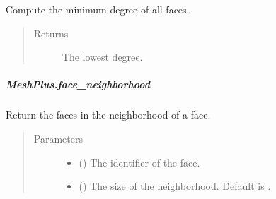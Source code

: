 \documentclass[letterpaper,10pt,english]{sphinxmanual}
\begin{document}
\begin{fulllineitems}
\begin{fulllineitems}
\label{\detokenize{api/generated/directional_clustering.mesh.MeshPlus.face_min_degree:directional_clustering.mesh.MeshPlus.face_min_degree}}
Compute the minimum degree of all faces.
\begin{quote}\begin{description}
\item[{Returns}] \leavevmode
{} \textendash{} The lowest degree.

\end{description}\end{quote}

\end{fulllineitems}



\subparagraph{MeshPlus.face\_neighborhood}
\label{\detokenize{api/generated/directional_clustering.mesh.MeshPlus.face_neighborhood:meshplus-face-neighborhood}}\label{\detokenize{api/generated/directional_clustering.mesh.MeshPlus.face_neighborhood::doc}}

\begin{fulllineitems}
\label{\detokenize{api/generated/directional_clustering.mesh.MeshPlus.face_neighborhood:directional_clustering.mesh.MeshPlus.face_neighborhood}}
Return the faces in the neighborhood of a face.
\begin{quote}\begin{description}
\item[{Parameters}] \leavevmode\begin{itemize}
\item {} 
 () \textendash{} The identifier of the face.

\item {} 
 () \textendash{} The size of the neighborhood.
Default is .

\end{itemize}


\end{description}
\end{quote}
\end{fulllineitems}
\end{fulllineitems}
\end{document}
